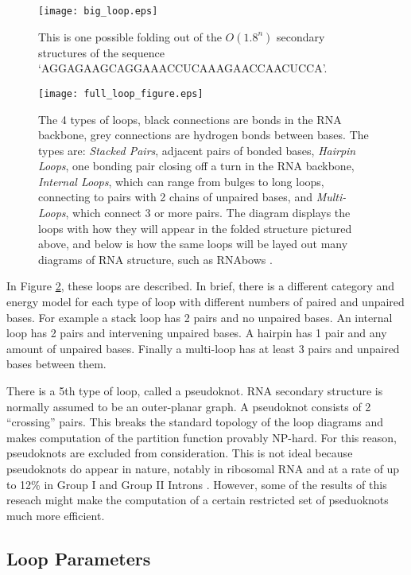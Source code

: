 \begin{figure}[t]
\texttt{[image: big\_loop.eps]}
\caption{This is one possible folding out of the $O(1.8^n)$ secondary
    structures of the sequence
    `AGGAGAAGCAGGAAACCUCAAAGAACCAACUCCA'. }
\label{fig:ssExample}
\end{figure}
\begin{figure}[t]

\texttt{[image: full\_loop\_figure.eps]}
\caption{The 4 types of loops, black connections are bonds in the RNA
  backbone, grey connections are hydrogen bonds between bases. The
  types are: \textit{Stacked Pairs}, adjacent pairs of bonded bases,
  \textit{Hairpin Loops}, one bonding pair closing off a turn in the
  RNA backbone, \textit{Internal Loops}, which can range from bulges
  to long loops, connecting to pairs with 2 chains of unpaired bases,
  and \textit{Multi-Loops}, which connect 3 or more pairs. The diagram
  displays the loops with how they will appear in the folded structure
  pictured above, and below is how the same loops will be layed out
  many diagrams of RNA structure, such as RNAbows
  \cite{aalberts2013visualizing}.}
\label{fig:loopFigure}
\end{figure}

In Figure \ref{fig:loopFigure}, these loops are described. In brief,
there is a different category and energy model for each type of loop
with different numbers of paired and unpaired bases. For example a
stack loop has 2 pairs and no unpaired bases. An internal loop has 2
pairs and intervening unpaired bases. A hairpin has 1 pair and any
amount of unpaired bases. Finally a multi-loop has at least 3 pairs
and unpaired bases between them.

There is a 5th type of loop, called a pseudoknot. RNA secondary
structure is normally assumed to be an outer-planar graph. A
pseudoknot consists of 2 ``crossing'' pairs. This breaks the standard
topology of the loop diagrams and makes computation of the partition
function provably NP-hard. For this reason, pseudoknots
are excluded from consideration. This is not ideal because pseudoknots
do appear in nature, notably in ribosomal RNA and at a rate of up to
12\% in Group I and Group II Introns
\cite{mathews1999expanded}. However, some of the results of this
reseach might make the computation of a certain restricted set of
pseduoknots much more efficient.


\subsection{Loop Parameters} 

